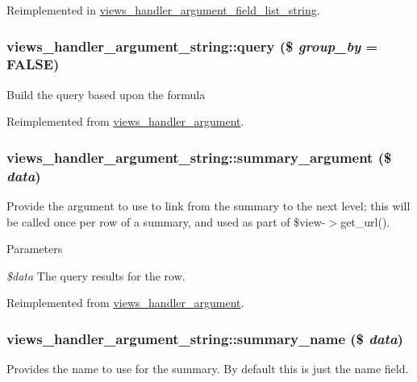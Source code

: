 Reimplemented in \hyperlink{classviews__handler__argument__field__list__string_a4e4a9d1fc93be565b57059152d21ae03}{views\_\-handler\_\-argument\_\-field\_\-list\_\-string}.\hypertarget{classviews__handler__argument__string_a71b6d00e2153228362f443353617a7be}{
\subsubsection[{query}]{\setlength{\rightskip}{0pt plus 5cm}views\_\-handler\_\-argument\_\-string::query (\$ {\em group\_\-by} = {\ttfamily FALSE})}}
\label{classviews__handler__argument__string_a71b6d00e2153228362f443353617a7be}
Build the query based upon the formula 

Reimplemented from \hyperlink{classviews__handler__argument_af9ddabf5d386782c8ffc5785b7ae4263}{views\_\-handler\_\-argument}.\hypertarget{classviews__handler__argument__string_a185c0d31b97f98df85073d53b3f8c26d}{
\subsubsection[{summary\_\-argument}]{\setlength{\rightskip}{0pt plus 5cm}views\_\-handler\_\-argument\_\-string::summary\_\-argument (\$ {\em data})}}
\label{classviews__handler__argument__string_a185c0d31b97f98df85073d53b3f8c26d}
Provide the argument to use to link from the summary to the next level; this will be called once per row of a summary, and used as part of \$view-\/$>$get\_\-url().


\begin{DoxyParams}{Parameters}
\item[{\em \$data}]The query results for the row. \end{DoxyParams}


Reimplemented from \hyperlink{classviews__handler__argument_aad03acefdb44288d7e6c7793bc33f66c}{views\_\-handler\_\-argument}.\hypertarget{classviews__handler__argument__string_a8cc60c274ca743c78de23260edc3ee4a}{
\subsubsection[{summary\_\-name}]{\setlength{\rightskip}{0pt plus 5cm}views\_\-handler\_\-argument\_\-string::summary\_\-name (\$ {\em data})}}
\label{classviews__handler__argument__string_a8cc60c274ca743c78de23260edc3ee4a}
Provides the name to use for the summary. By default this is just the name field.


